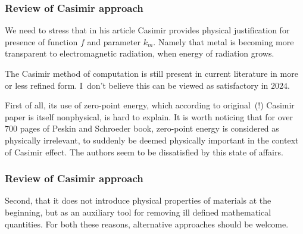 \documentclass[10pt,t]{beamer}
\begin{document}
\begin{frame}
  \frametitle{Review of Casimir approach}


  We need to stress that in his article Casimir provides physical
  justification for presence of function $f$ and parameter $k_{ m }$.
  Namely that metal is becoming more transparent to electromagnetic
  radiation, when energy of radiation grows.

  The Casimir method of computation is still present in current literature
  in more or less refined form. I~don't believe this can be viewed
  as satisfactory in $2024$.

  First of all, its use of zero-point energy, which according to
  original~(!) Casimir paper is itself nonphysical, is hard to explain.
  It is worth noticing that for over $700$ pages of Peskin and Schroeder
  book, zero-point energy is considered as physically irrelevant, to
  suddenly be deemed physically important in the context of Casimir
  effect. The authors seem to be dissatisfied by this state of affairs.


\end{frame}





\begin{frame}
  \frametitle{Review of Casimir approach}




  Second, that it does not introduce physical properties of materials at the
  beginning, but as an auxiliary tool for removing ill defined mathematical
  quantities. For both these reasons, alternative approaches should be
  welcome.

\end{frame}
\end{document}
